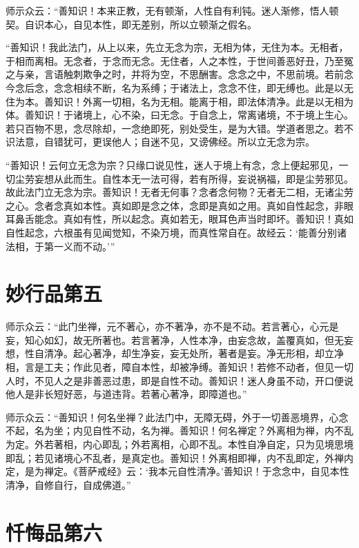 \documentclass[UTF8, 11pt, oneside]{ctexart}
\begin{document}
师示众云：“善知识！本来正教，无有顿渐，人性自有利钝。迷人渐修，悟人顿契。自识本心，自见本性，即无差别，所以立顿渐之假名。

“善知识！我此法门，从上以来，先立无念为宗，无相为体，无住为本。无相者，于相而离相。无念者，于念而无念。无住者，人之本性，于世间善恶好丑，乃至冤之与亲，言语触刺欺争之时，并将为空，不思酬害。念念之中，不思前境。若前念今念后念，念念相续不断，名为系缚；于诸法上，念念不住，即无缚也。此是以无住为本。善知识！外离一切相，名为无相。能离于相，即法体清净。此是以无相为体。善知识！于诸境上，心不染，曰无念。于自念上，常离诸境，不于境上生心。若只百物不思，念尽除却，一念绝即死，别处受生，是为大错。学道者思之。若不识法意，自错犹可，更误他人；自迷不见，又谤佛经。所以立无念为宗。

“善知识！云何立无念为宗？只缘口说见性，迷人于境上有念，念上便起邪见，一切尘劳妄想从此而生。自性本无一法可得，若有所得，妄说祸福，即是尘劳邪见。故此法门立无念为宗。善知识！无者无何事？念者念何物？无者无二相，无诸尘劳之心。念者念真如本性。真如即是念之体，念即是真如之用。真如自性起念，非眼耳鼻舌能念。真如有性，所以起念。真如若无，眼耳色声当时即坏。善知识！真如自性起念，六根虽有见闻觉知，不染万境，而真性常自在。故经云：‘能善分别诸法相，于第一义而不动。’”



\section*{妙行品第五}

师示众云：“此门坐禅，元不著心，亦不著净，亦不是不动。若言著心，心元是妄，知心如幻，故无所著也。若言著净，人性本净，由妄念故，盖覆真如，但无妄想，性自清净。起心著净，却生净妄，妄无处所，著者是妄。净无形相，却立净相，言是工夫；作此见者，障自本性，却被净缚。善知识！若修不动者，但见一切人时，不见人之是非善恶过患，即是自性不动。善知识！迷人身虽不动，开口便说他人是非长短好恶，与道违背。若著心著净，即障道也。”

师示众云：“善知识！何名坐禅？此法门中，无障无碍，外于一切善恶境界，心念不起，名为坐；内见自性不动，名为禅。善知识！何名禅定？外离相为禅，内不乱为定。外若著相，内心即乱；外若离相，心即不乱。本性自净自定，只为见境思境即乱；若见诸境心不乱者，是真定也。善知识！外离相即禅，内不乱即定，外禅内定，是为禅定。《菩萨戒经》云：‘我本元自性清净。’善知识！于念念中，自见本性清净，自修自行，自成佛道。”



\section*{忏悔品第六}
\end{document}
